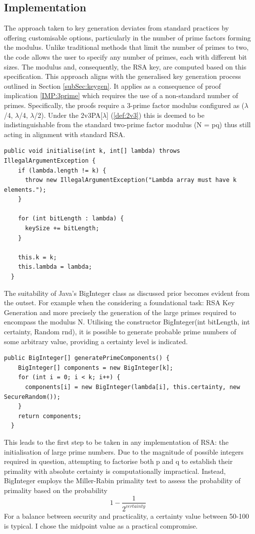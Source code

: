 \documentclass[]{final_report}
\theoremstyle{definition}
\begin{document}
\subsection{Implementation}
The approach taken to key generation deviates from standard practices by offering customisable options, particularly in the number of prime factors forming the modulus. Unlike traditional methods that limit the number of primes to two, the code allows the user to specify any number of primes, each with different bit sizes. The modulus and, consequently, the RSA key, are computed based on this specification. This approach aligns with the generalised key generation process outlined in Section \ref{subSec:keygen}. It applies as a consequence of proof implication \ref{IMP:3prime} which requires the use of a non-standard number of primes.  Specifically, the proofs require a 3-prime factor modulus configured as ($\lambda$/4, $\lambda$/4, $\lambda$/2). Under the 2v3PA[$\lambda$] (\ref{def:2v3}) this is deemed to be indistinguishable from the standard two-prime factor modulus (N = pq) thus still acting in alignment with standard RSA.


\begin{lstlisting}[caption=Initialisation of parametrisable Key Generation]
public void initialise(int k, int[] lambda) throws IllegalArgumentException {
    if (lambda.length != k) {
      throw new IllegalArgumentException("Lambda array must have k elements.");
    }

    for (int bitLength : lambda) { 
      keySize += bitLength;
    }

    this.k = k;
    this.lambda = lambda;
  }
 \end{lstlisting}
 
The suitability of Java's BigInteger class as discussed prior becomes evident from the outset. For example when the considering a foundational task: RSA Key Generation and more precisely the generation of the large primes required to encompass the modulus N.
Utilising the constructor BigInteger(int bitLength, int certainty, Random rnd), it is possible to generate probable prime numbers of some arbitrary value, providing a certainty level is indicated.
\begin{lstlisting}[caption=Parametrisable Prime Generation with BigInteger]
public BigInteger[] generatePrimeComponents() {
    BigInteger[] components = new BigInteger[k];
    for (int i = 0; i < k; i++) {
      components[i] = new BigInteger(lambda[i], this.certainty, new SecureRandom());
    }
    return components;
  }
\end{lstlisting}
This leads to the first step to be taken in any implementation of RSA: the initialisation of large prime numbers. 
Due to the magnitude of possible integers required in question, attempting to factorise both p and q to establish their primality with absolute certainty is computationally impractical. Instead, BigInteger employs the Miller-Rabin primality test to assess the probability of primality based on the probability  \[ 1 - \frac{1}{2^{certainty}}\]
For a balance between security and practicality, a certainty value between 50-100 is typical. I chose the midpoint value as a practical compromise.
\end{document}
